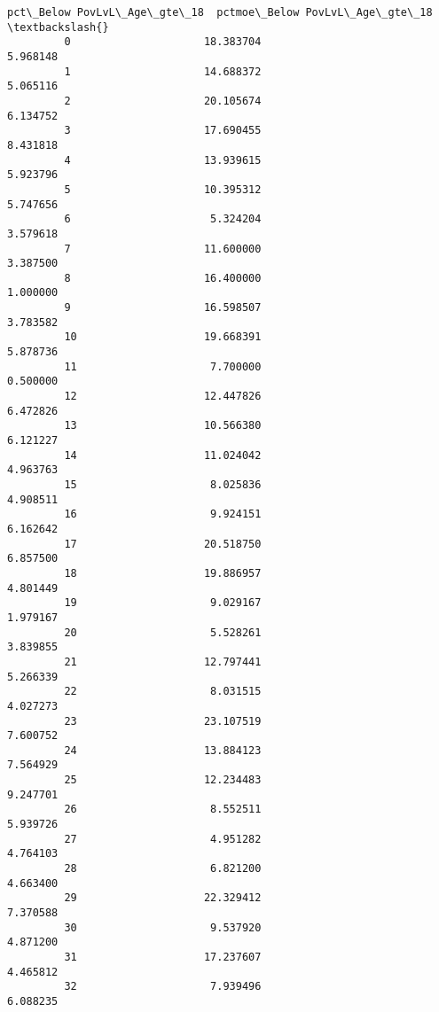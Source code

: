 \documentclass[11pt]{article}
\begin{document}
\begin{Verbatim}[commandchars=\\\{\}]
             pct\_Below PovLvL\_Age\_gte\_18  pctmoe\_Below PovLvL\_Age\_gte\_18  \textbackslash{}
         0                     18.383704                        5.968148   
         1                     14.688372                        5.065116   
         2                     20.105674                        6.134752   
         3                     17.690455                        8.431818   
         4                     13.939615                        5.923796   
         5                     10.395312                        5.747656   
         6                      5.324204                        3.579618   
         7                     11.600000                        3.387500   
         8                     16.400000                        1.000000   
         9                     16.598507                        3.783582   
         10                    19.668391                        5.878736   
         11                     7.700000                        0.500000   
         12                    12.447826                        6.472826   
         13                    10.566380                        6.121227   
         14                    11.024042                        4.963763   
         15                     8.025836                        4.908511   
         16                     9.924151                        6.162642   
         17                    20.518750                        6.857500   
         18                    19.886957                        4.801449   
         19                     9.029167                        1.979167   
         20                     5.528261                        3.839855   
         21                    12.797441                        5.266339   
         22                     8.031515                        4.027273   
         23                    23.107519                        7.600752   
         24                    13.884123                        7.564929   
         25                    12.234483                        9.247701   
         26                     8.552511                        5.939726   
         27                     4.951282                        4.764103   
         28                     6.821200                        4.663400   
         29                    22.329412                        7.370588   
         30                     9.537920                        4.871200   
         31                    17.237607                        4.465812   
         32                     7.939496                        6.088235   

\end{Verbatim}
\end{document}
